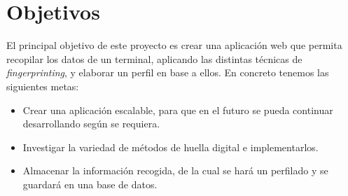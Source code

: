 \section{Objetivos}
 
El principal objetivo de este proyecto es crear una aplicación web que permita recopilar los datos de un terminal, aplicando las distintas técnicas de \textit{fingerprinting}, y elaborar un perfil en base a ellos. En concreto tenemos las siguientes metas:
\begin{itemize}
    \item Crear una aplicación escalable, para que en el futuro se pueda continuar desarrollando según se requiera.
    \item Investigar la variedad de métodos de huella digital e implementarlos.
    \item Almacenar la información recogida, de la cual se hará un perfilado y se guardará en una base de datos.
\end{itemize}

